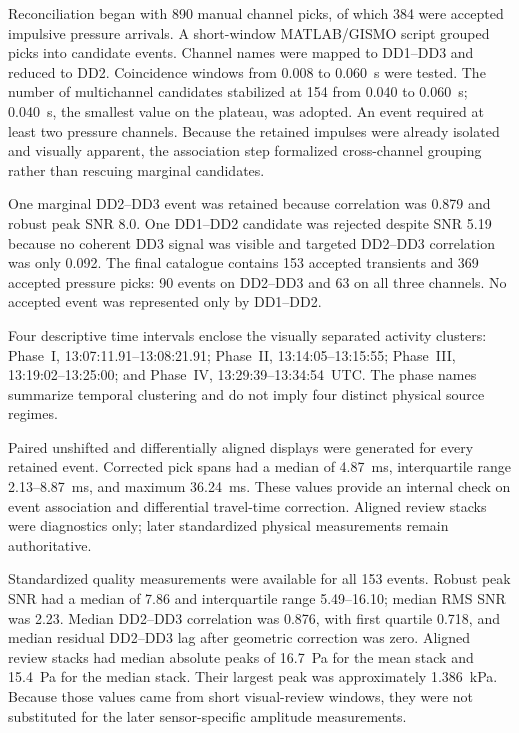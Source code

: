 \documentclass[]{seismica}
\begin{document}
Reconciliation began with 890 manual channel picks, of which 384 were accepted
impulsive pressure arrivals. A short-window MATLAB/GISMO script
\citep{thompson_gismo_2017} grouped picks into candidate events. Channel names
were mapped to DD1--DD3 and reduced to
DD2. Coincidence windows from 0.008 to 0.060~s were tested. The number of
multichannel candidates stabilized at 154 from 0.040 to 0.060~s; 0.040~s, the
smallest value on the plateau, was adopted. An event required at least two
pressure channels. Because the retained impulses were already isolated and
visually apparent, the association step formalized cross-channel grouping
rather than rescuing marginal candidates.

One marginal DD2--DD3 event was retained because correlation was 0.879 and
robust peak SNR 8.0. One DD1--DD2 candidate was rejected despite SNR 5.19
because no coherent DD3 signal was visible and targeted DD2--DD3 correlation
was only 0.092. The final catalogue contains 153 accepted transients and 369
accepted pressure picks: 90 events on DD2--DD3 and 63 on all three channels.
No accepted event was represented only by DD1--DD2.

Four descriptive time intervals enclose the visually separated activity
clusters: Phase~I, 13:07:11.91--13:08:21.91; Phase~II,
13:14:05--13:15:55; Phase~III, 13:19:02--13:25:00; and Phase~IV,
13:29:39--13:34:54~UTC. The phase names summarize temporal clustering and do
not imply four distinct physical source regimes.

Paired unshifted and differentially aligned displays were generated for every
retained event. Corrected pick spans had a median of 4.87~ms, interquartile
range 2.13--8.87~ms, and maximum 36.24~ms. These values provide an internal
check on event association and differential travel-time correction. Aligned
review stacks were diagnostics only; later standardized physical measurements
remain authoritative.

Standardized quality measurements were available for all 153 events. Robust
peak SNR had a median of 7.86 and interquartile range 5.49--16.10; median RMS
SNR was 2.23. Median DD2--DD3 correlation was 0.876, with first quartile
0.718, and median residual DD2--DD3 lag after geometric correction was zero.
Aligned review stacks had median absolute peaks of 16.7~Pa for the mean stack
and 15.4~Pa for the median stack. Their largest peak was approximately
1.386~kPa. Because those values came from short visual-review windows, they
were not substituted for the later sensor-specific amplitude measurements.
\end{document}

